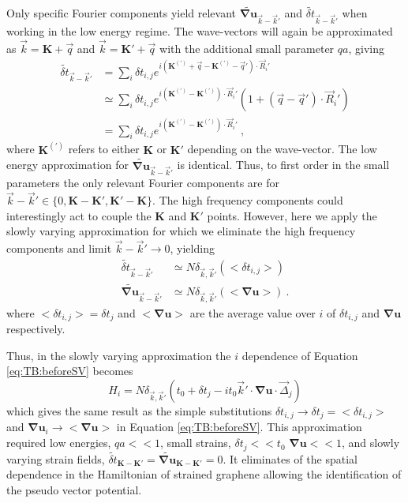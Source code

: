 Only specific Fourier components yield relevant $\widetilde{\bm{\nabla u}}_{\vec{k}-\vec{k}'}$ and $\widetilde{\delta t}_{\vec{k}-\vec{k}'}$ when working in the low energy regime.
The wave-vectors will again be approximated as $\vec{k}=\bm{K}+\vec{q}$ and $\vec{k}=\bm{K'}+\vec{q}$ with the additional small parameter $qa$, giving
\begin{align*}
  \widetilde{\delta t}_{\vec{k}-\vec{k}'} &=
    \sum_i \delta t_{i,j} e^{i(\bm{K^{(')}}+\vec{q}-\bm{K^{(')}}-\vec{q}') \cdot \vec{R}_i'} \\
                              &\simeq 
    \sum_i \delta t_{i,j} e^{i(\bm{K^{(')}}-\bm{K^{(')}}) \cdot \vec{R}_i'} (1+(\vec{q}-\vec{q}') \cdot \vec{R}_i') \\
                              &=
    \sum_i \delta t_{i,j} e^{i(\bm{K^{(')}}-\bm{K^{(')}}) \cdot \vec{R}_i'} \ ,
\end{align*}
where $\bm{K^{(')}}$ refers to either $\bm{K}$ or $\bm{K'}$ depending on the wave-vector.
The low energy approximation for $\widetilde{\bm{\nabla u}}_{\vec{k}-\vec{k}'}$ is identical.
Thus, to first order in the small parameters the only relevant Fourier components are for $\vec{k}-\vec{k}' \in \{0,\bm{K}-\bm{K'}, \bm{K'}-\bm{K} \}$.
The high frequency components could interestingly act to couple the $\bm{K}$ and $\bm{K}'$ points.
However, here we apply the slowly varying approximation for which we eliminate the high frequency components and limit $\vec{k}-\vec{k}' \rightarrow 0$, yielding
\begin{align*}
  \widetilde{\delta t}_{\vec{k}-\vec{k}'}     & \simeq N \delta_{\vec{k},\vec{k}'} ( <\delta t_{i,j}>) \\
  \widetilde{\bm{\nabla u}}_{\vec{k}-\vec{k}'}& \simeq N \delta_{\vec{k},\vec{k}'} ( <\bm{\nabla u} >) \ .
\end{align*}
where $<\delta t_{i,j}>=\delta t_j$ and $<\bm{\nabla u}>$ are the average value over $i$ of $\delta t_{i,j}$ and $\bm{\nabla u}$ respectively.

Thus, in the slowly varying approximation the $i$ dependence of Equation \ref{eq:TB:beforeSV} becomes
\begin{equation*}
	H_i=N \delta_{\vec{k},\vec{k}'}  \left( t_0 + \delta t_j - i t_0 \vec{k}' \cdot \bm{\nabla u} \cdot \vec{\Delta}_j \right)
\end{equation*}
which gives the same result as the simple substitutions $\delta t_{i,j} \rightarrow \delta t_j=<\delta t_{i,j}>$ and $\bm{\nabla u}_i \rightarrow <\bm{\nabla u}>$ in Equation \ref{eq:TB:beforeSV}.
This approximation required low energies, $qa<<1$, small strains, $\delta t_j << t_0$ $\bm{\nabla u}<<1$, and slowly varying strain fields, $\widetilde{\delta t}_{\bm{K}-\bm{K}'}=\widetilde{\bm{\nabla u}}_{\bm{K}-\bm{K}'}=0$.
It eliminates of the spatial dependence in the Hamiltonian of strained graphene allowing the identification of the pseudo vector potential.